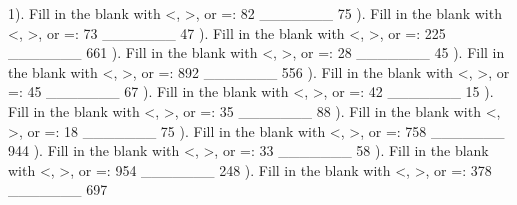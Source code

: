 \documentclass{article}%
\begin{document}
1). Fill in the blank with <, >, or =: 82 \_\_\_\_\_\_\_ 75%
\newline%
\newline%
). Fill in the blank with <, >, or =: 73 \_\_\_\_\_\_\_ 47%
\newline%
\newline%
). Fill in the blank with <, >, or =: 225 \_\_\_\_\_\_\_ 661%
\newline%
\newline%
). Fill in the blank with <, >, or =: 28 \_\_\_\_\_\_\_ 45%
\newline%
\newline%
). Fill in the blank with <, >, or =: 892 \_\_\_\_\_\_\_ 556%
\newline%
\newline%
). Fill in the blank with <, >, or =: 45 \_\_\_\_\_\_\_ 67%
\newline%
\newline%
). Fill in the blank with <, >, or =: 42 \_\_\_\_\_\_\_ 15%
\newline%
\newline%
). Fill in the blank with <, >, or =: 35 \_\_\_\_\_\_\_ 88%
\newline%
\newline%
). Fill in the blank with <, >, or =: 18 \_\_\_\_\_\_\_ 75%
\newline%
\newline%
). Fill in the blank with <, >, or =: 758 \_\_\_\_\_\_\_ 944%
\newline%
\newline%
). Fill in the blank with <, >, or =: 33 \_\_\_\_\_\_\_ 58%
\newline%
\newline%
). Fill in the blank with <, >, or =: 954 \_\_\_\_\_\_\_ 248%
\newline%
\newline%
). Fill in the blank with <, >, or =: 378 \_\_\_\_\_\_\_ 697%
\end{document}
